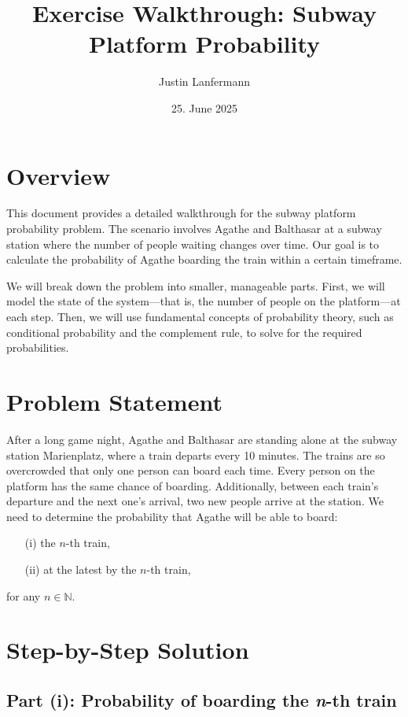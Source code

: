 \documentclass[11pt,a4paper]{article}
\title{Exercise Walkthrough: Subway Platform Probability}
\author{Justin Lanfermann}
\date{25. June 2025}
\begin{document}
\maketitle

\section*{Overview}
This document provides a detailed walkthrough for the subway platform probability problem. The scenario involves Agathe and Balthasar at a subway station where the number of people waiting changes over time. Our goal is to calculate the probability of Agathe boarding the train within a certain timeframe.

We will break down the problem into smaller, manageable parts. First, we will model the state of the system—that is, the number of people on the platform—at each step. Then, we will use fundamental concepts of probability theory, such as conditional probability and the complement rule, to solve for the required probabilities.

\section{Problem Statement}
After a long game night, Agathe and Balthasar are standing alone at the subway station Marienplatz, where a train departs every 10 minutes. The trains are so overcrowded that only one person can board each time. Every person on the platform has the same chance of boarding. Additionally, between each train's departure and the next one's arrival, two new people arrive at the station. We need to determine the probability that Agathe will be able to board:
\begin{itemize}
    \item[(i)] the $n$-th train,
    \item[(ii)] at the latest by the $n$-th train,
\end{itemize}
for any $n \in \mathbb{N}$.

\section{Step-by-Step Solution}

\subsection{Part (i): Probability of boarding the \textit{n}-th train}
\end{document}
